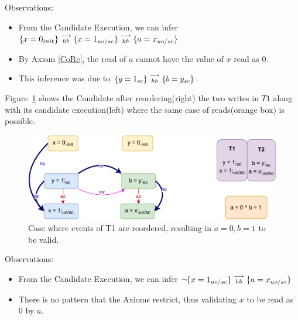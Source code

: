         Observations:
        \begin{itemize}
            \item From the Candidate Execution, we can infer $\{x=0_{init}\}\stackrel{\longrightarrow}{_{hb}}\{x=1_{uo/sc}\}\stackrel{\longrightarrow}{_{hb}}\{a=x_{uo/sc}\}$
            \item By Axiom \ref{CoRe}, the read of $a$ cannot have the value of $x$ read as $0$. 
            \item This inference was due to $\{y=1_{sc}\}\stackrel{\longrightarrow}{_{hb}}\{b=y_{sc}\}$.
        \end{itemize}

        Figure~\ref{reord_counter:example4(b)} shows the Candidate after reordering(right) the two writes in $T1$ along with its candidate execution(left) where the same case of reads(orange box) is possible. 
        \begin{figure}[H]
            \centering
            \includegraphics[scale=0.7]{5.InstructionReordering/4.ValidReorderingCandidate/Example7R(Wuo,sc-Wsc).pdf}
            \caption{Case where events of T1 are reordered, resulting in $a = 0,  b = 1$ to be valid.}
            \label{reord_counter:example4(b)}
        \end{figure}
        
        Observations:
        \begin{itemize}
            \item From the Candidate Execution, we can infer $\neg\{x=1_{uo/sc}\}\stackrel{\longrightarrow}{_{hb}}\{a=x_{uo/sc}\}$
            \item There is no pattern that the Axioms restrict, thus validating $x$ to be read as $0$ by $a$. 
        \end{itemize}